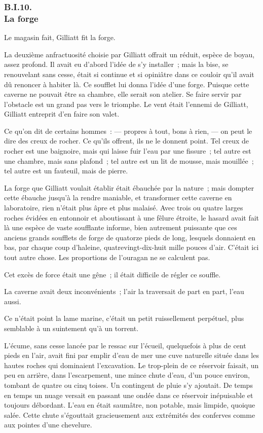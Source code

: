 \documentclass[french,twoside]{book} %
\begin{document}
 \subsubsection[{B.I.10. La forge}]{B.I.10. \\
La forge}
\noindent Le magasin fait, Gilliatt fit la forge.\par
La deuxième anfractuosité choisie par Gilliatt offrait un réduit, espèce de boyau, assez profond. Il avait eu d’abord l’idée de s’y installer ; mais la bise, se renouvelant sans cesse, était si continue et si opiniâtre dans ce couloir qu’il avait dû renoncer à habiter là. Ce soufflet lui donna l’idée d’une forge. Puisque cette caverne ne pouvait être sa chambre, elle serait son atelier. Se faire servir par l’obstacle est un grand pas vers le triomphe. Le vent était l’ennemi de Gilliatt, Gilliatt entreprit d’en faire son valet.\par
Ce qu’on dit de certains hommes : — propres à tout, bons à rien, — on peut le dire des creux de rocher. Ce qu’ils offrent, ils ne le donnent point. Tel creux de rocher est une baignoire, mais qui laisse fuir l’eau par une fissure ; tel autre est une chambre, mais sans plafond ; tel autre est un lit de mousse, mais mouillée ; tel autre est un fauteuil, mais de pierre.\par
 La forge que Gilliatt voulait établir était ébauchée par la nature ; mais dompter cette ébauche jusqu’à la rendre maniable, et transformer cette caverne en laboratoire, rien n’était plus âpre et plus malaisé. Avec trois ou quatre larges roches évidées en entonnoir et aboutissant à une fêlure étroite, le hasard avait fait là une espèce de vaste soufflante informe, bien autrement puissante que ces anciens grands soufflets de forge de quatorze pieds de long, lesquels donnaient en bas, par chaque coup d’haleine, quatrevingt-dix-huit mille pouces d’air. C’était ici tout autre chose. Les proportions de l’ouragan ne se calculent pas.\par
Cet excès de force était une gêne ; il était difficile de régler ce souffle.\par
La caverne avait deux inconvénients ; l’air la traversait de part en part, l’eau aussi.\par
Ce n’était point la lame marine, c’était un petit ruissellement perpétuel, plus semblable à un suintement qu’à un torrent.\par
L’écume, sans cesse lancée par le ressac sur l’écueil, quelquefois à plus de cent pieds en l’air, avait fini par emplir d’eau de mer une cuve naturelle située dans les hautes roches qui dominaient l’excavation. Le trop-plein de ce réservoir faisait, un peu en arrière, dans l’escarpement, une mince chute d’eau, d’un pouce environ, tombant de quatre ou cinq toises. Un contingent de pluie s’y ajoutait. De temps en temps un nuage versait en passant une ondée dans ce réservoir inépuisable et toujours débordant. L’eau en était saumâtre, non potable, mais limpide, quoique salée. Cette  chute s’égouttait gracieusement aux extrémités des conferves comme aux pointes d’une chevelure.\par
\end{document}
